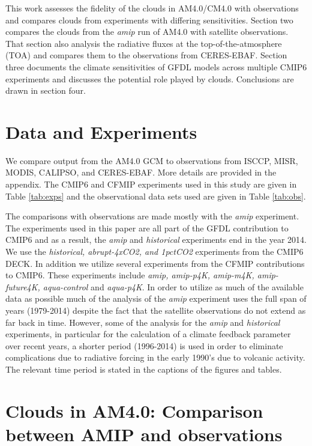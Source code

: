 \documentclass[draft]{agujournal2019}
\begin{document}
This work assesses the fidelity of the clouds in AM4.0/CM4.0 with observations and compares clouds from experiments 
with differing sensitivities. 
Section two compares the clouds from the \textit{amip} run of AM4.0 with satellite observations.  That section also 
analysis the radiative fluxes at the top-of-the-atmosphere (TOA) and compares them to the observations from 
CERES-EBAF.    Section three documents the climate sensitivities of GFDL models across multiple CMIP6 experiments 
and discusses the potential role played by clouds.   Conclusions are drawn in section four.  

\section{Data and Experiments}

We compare output from the AM4.0 GCM to observations from ISCCP, MISR, MODIS, CALIPSO, and CERES-EBAF.
More details are provided in the appendix.  The CMIP6 and CFMIP experiments used in this study are given in Table
\ref{tab:exps} and the observational data sets used are given in Table \ref{tab:obs}.

The comparisons with observations are made mostly with the \textit{amip} experiment.   The experiments used 
in this paper are all part of the GFDL contribution to CMIP6 and as a result, the \textit{amip} and \textit{historical}
experiments end in the year 2014.  We use the \textit{historical, abrupt-4xCO2, and 1pctCO2}
experiments from the CMIP6 DECK.  In addition we utilize several experiments from the CFMIP contributions 
to CMIP6.  These experiments include \textit{amip, amip-p4K, amip-m4K, amip-future4K, aqua-control} and \textit{aqua-p4K}.  
In order to utilize as much of the available data as possible much of the analysis of the \textit{amip} experiment uses the 
full span of years (1979-2014) despite the fact that the satellite observations do not extend as far back in time.  However, 
some of the analysis for the \textit{amip} and \textit{historical} experiments, in particular for the calculation of a climate feedback parameter over recent years, a shorter period (1996-2014) is used in order to eliminate complications due to radiative forcing in the early 1990's due to volcanic activity.  The relevant time period is stated in the captions of the figures and tables.   



\section{Clouds in AM4.0: Comparison between AMIP and observations}
\end{document}
